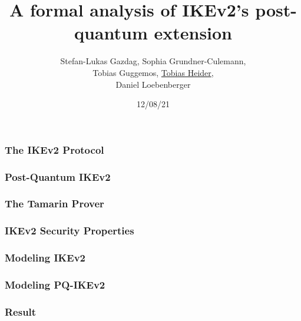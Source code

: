 \documentclass{beamer}
\title{A formal analysis of IKEv2's post-quantum extension}
\author{Stefan-Lukas Gazdag, Sophia Grundner-Culemann,\\
    Tobias Guggemos, \underline{Tobias Heider},\\
    Daniel Loebenberger}
\institute{ACSAC2021}
\date{12/08/21}
\begin{document}
\begin{frame}
	\titlepage
\end{frame}

\begin{frame}
\frametitle{The IKEv2 Protocol}
\end{frame}

\begin{frame}
\frametitle{Post-Quantum IKEv2}
\end{frame}

\begin{frame}
\frametitle{The Tamarin Prover}
\end{frame}

\begin{frame}
\frametitle{IKEv2 Security Properties}
\end{frame}

\begin{frame}
\frametitle{Modeling IKEv2}
\end{frame}

\begin{frame}
	\frametitle{Modeling PQ-IKEv2}
\end{frame}

\begin{frame}
\frametitle{Result}
\end{frame}
\end{document}
